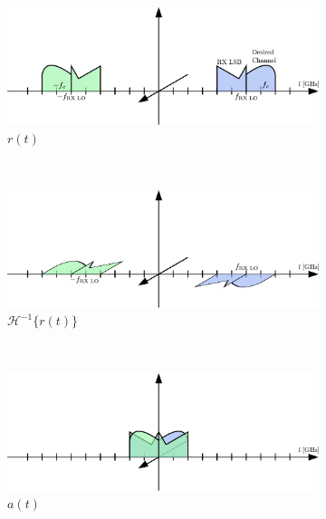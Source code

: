 \begin{figure}[p]
  \centering
  \begin{subfigure}{0.45\textwidth}
    \centering
    \includegraphics[width=\textwidth]{figures/rx_rf_1_freq_s}
    \caption{$r(t)$}
    \label{fig:rx_rf_1_freq_s}
  \end{subfigure}
  ~
  \begin{subfigure}{0.45\textwidth}
    \centering
    \includegraphics[width=\textwidth]{figures/rx_rf_1_freq_Hs}
    \caption{$\mathcal{H}^{-1}\{r(t)\}$}
    \label{fig:rx_rf_1_freq_Hs}
  \end{subfigure}
  \vspace{4ex} \\
  \begin{subfigure}{0.45\textwidth}
    \centering
    \includegraphics[width=\textwidth]{figures/rx_rf_1_freq_a}
    \caption{$a(t)$}
    \label{fig:rx_rf_1_freq_a}
  \end{subfigure}
  ~
  \begin{subfigure}{0.45\textwidth}
    \centering

\end{subfigure}
\end{figure}
